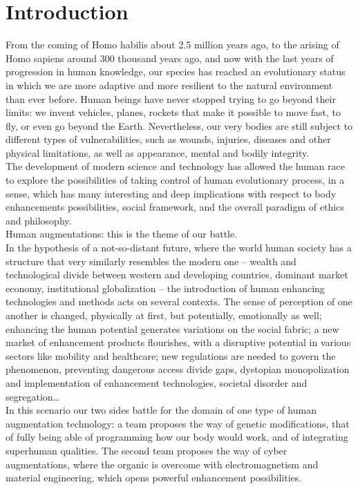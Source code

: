 \chapter*{Introduction}
\label{cha:introduction}

From the coming of Homo habilis about 2.5 million years ago, to the arising of Homo sapiens around 300 thousand years ago, and now with the last years of progression in human knowledge, our species has reached an evolutionary status in which we are more adaptive and more resilient to the natural environment than ever before. Human beings have never stopped trying to go beyond their limits: we invent vehicles, planes, rockets that make it possible to move fast, to fly, or even go beyond the Earth. Nevertheless, our very bodies are still subject to different types of vulnerabilities, such as wounds, injuries, diseases and other physical limitations, as well as appearance, mental and bodily integrity.\\

The development of modern science and technology has allowed the human race to explore the possibilities of taking control of human evolutionary process, in a sense, which has many interesting and deep implications with respect to body enhancements possibilities, social framework, and the overall paradigm of ethics and philosophy.\\

Human augmentations: this is the theme of our battle.\\

In the hypothesis of a not-so-distant future, where the world human society has a structure that very similarly resembles the modern one – wealth and technological divide between western and developing countries, dominant market economy, institutional globalization – the introduction of human enhancing technologies and methods acts on several contexts. The sense of perception of one another is changed, physically at first, but potentially, emotionally as well; enhancing the human potential generates variations on the social fabric; a new market of enhancement products flourishes, with a disruptive potential in various sectors like mobility and healthcare; new regulations are needed to govern the phenomenon, preventing dangerous access divide gaps, dystopian monopolization and implementation of enhancement technologies, societal disorder and segregation…\\

In this scenario our two sides battle for the domain of one type of human augmentation technology: a team proposes the way of genetic modifications, that of fully being able of programming how our body would work, and of integrating superhuman qualities. The second team proposes the way of cyber augmentations, where the organic is overcome with electromagnetism and material engineering, which opens powerful enhancement possibilities.
